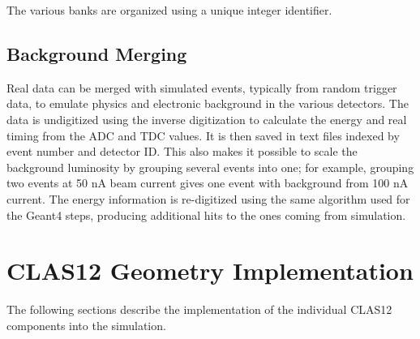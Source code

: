 The various banks are organized using a unique integer identifier.

\subsection{Background Merging}\label{bmerging}

Real data can be merged with simulated events, typically from random trigger data, to emulate physics and electronic background in
the various detectors.
The data is un\-digitized using the inverse digitization to calculate the energy and real timing from the ADC and TDC values.
It is then saved in text files indexed by event number and detector ID. This also makes it possible to scale the background luminosity by grouping
several events into one; for example, grouping two events at 50 nA beam current gives one event with background from 100 nA current.
The energy information is re-digitized using the same algorithm used for the Geant4 steps, producing additional hits to the ones coming from simulation.


\section{CLAS12 Geometry Implementation}

The following sections describe the implementation of the individual CLAS12 components into the simulation.

